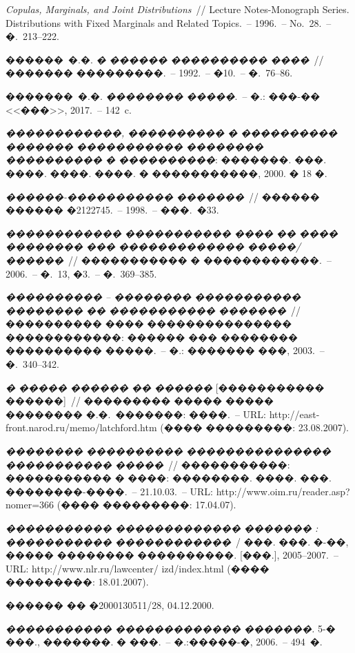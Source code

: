 \documentclass[11pt]{ubs}
\begin{document}
\begin{thebibliography}{10}
 \textit{Copulas, Marginals, and Joint Distributions}~// Lecture Notes-Monograph Series. Distributions with Fixed Marginals and Related Topics.~-- 1996.~-- No.~28.~-- �.~213--222.


  {\MakeUppercase{������~�.�.}} \textit{� ������ ���������� ����}~// ������� ���������.~-- 1992.~-- �10.~-- �.~76--86.

  {\MakeUppercase{�������~�.�.}} \textit{�������� �����}.~-- �.: ���-�� <<���>>, 2017.~-- 142~c.


   \textit{������������, ���������� � ���������� ������� ����������� �������� ���������� � ����������}: �������. ���. ����. ����. ����. � �����������, 2000. � 18 �.

   \textit{������-����������� �������}~// ������ ������ �2122745.~-- 1998.~-- ���.~�33.

   \textit{������������ ����������� ���� �� ���� �������� ��� ������������� �����/������}~// ����������� � ������������.~-- 2006.~-- �.~13, �3.~-- �.~369--385.

   \textit{���������� -- �������� ����������� �������� �� ����������� �������}~// ���������� ���� ��������������� ������������: ������ ��� �������� ���������� �����.~-- �.: ������� ���, 2003.~-- �.~340--342.

   \textit{� ����� ������ �� ������} [����������� ������]~// ��������� ����� ����� �������� �.�.~�������: ����.~-- URL: http://east-front.narod.ru/memo/latchford.htm (���� ���������: 23.08.2007).

   \textit{�������� ���������� ��������������� ����������� �����}~// �����������: ����������� � ����: ��������. ����. ���. ��������-����.~-- 21.10.03.~-- URL: http://www.oim.ru/reader.asp?nomer=366 (���� ���������: 17.04.07).

  \textit{����������� ������������� ������� : ����������� ������������}~/ ���. ���. �-��, ����� �������� ����������. [���.], 2005--2007.~-- URL:  http://www.nlr.ru/lawcenter/ izd/index.html (���� ���������: 18.01.2007).

  ������ �� �2000130511/28, 04.12.2000.

   \textit{����������� ������������� �������.} 5-� ���., �������. � ���.~-- �.:�����-�, 2006.~-- 494~�.


\end{thebibliography}
\end{document}
